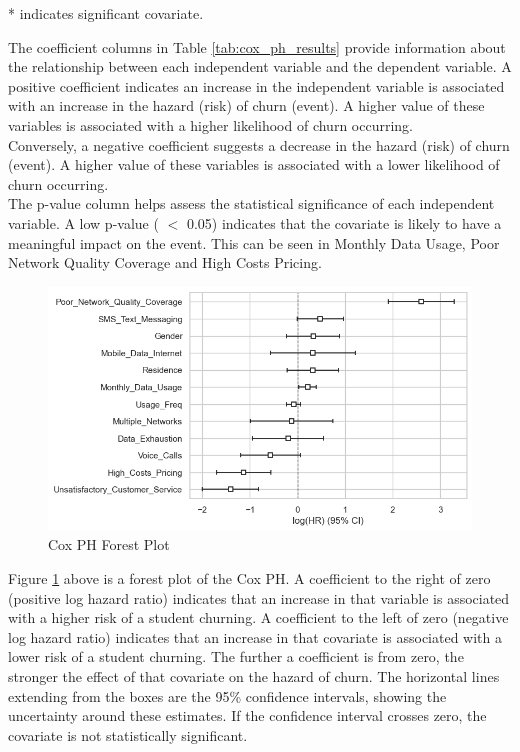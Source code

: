 \documentclass[doublespacing,12pt]{report}
\begin{document}
{* indicates significant covariate.}
\vspace{0.4cm}\\
\normalsize{\noindent The coefficient columns in Table \ref{tab:cox_ph_results} provide information about the relationship between each independent variable and the dependent variable. A positive coefficient indicates an increase in the independent variable is associated with an increase in the hazard (risk) of churn (event). A higher value of these variables is associated with a higher likelihood of churn occurring. \\
Conversely, a negative coefficient suggests a decrease in the hazard (risk) of churn (event). A higher value of these variables is associated with a lower likelihood of churn occurring.\\
The p-value column helps assess the statistical significance of each independent variable. A low p-value ( \(<\) 0.05) indicates that the covariate is likely to have a meaningful impact on the event. This can be seen in Monthly Data Usage, Poor Network Quality Coverage and High Costs Pricing.

\begin{figure}[H]
    \centering
    \includegraphics[width=1\linewidth]{Figure 4/4.2.png}
    \caption{Cox PH Forest Plot}
    \label{cox ph forest}
\end{figure}

\normalsize {\noindent Figure \ref{cox ph forest} above is a forest plot of the Cox PH. A coefficient to the right of zero (positive log hazard ratio) indicates that an increase in that variable is associated with a higher risk of a student churning. A coefficient to the left of zero (negative log hazard ratio) indicates that an increase in that covariate is associated with a lower risk of a student churning.
The further a coefficient is from zero, the stronger the effect of that covariate on the hazard of churn.
The horizontal lines extending from the boxes are the 95\% confidence intervals, showing the uncertainty around these estimates. If the confidence interval crosses zero, the covariate is not statistically significant.}

}
\end{document}
